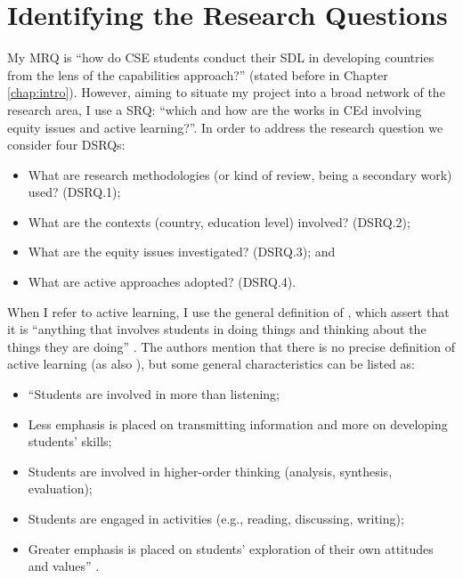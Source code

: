 \section{Identifying the Research Questions}
\label{rel-work:res-questions}

My \gls{MRQ} is “how do \gls{CSE} students conduct their \gls{SDL} in developing countries from the lens of the capabilities approach?” (stated before in Chapter \ref{chap:intro}). However, aiming to situate my project into a broad network of the research area, I use a \gls{SRQ}: “which and how are the works in \gls{CEd} involving equity issues and active learning?”. In order to address the research question we consider four \glspl{DSRQ}:
\begin{itemize}
    \item What are research methodologies (or kind of review, being a secondary work) used? (\gls{DSRQ}.1);
    \item What are the contexts (country, education level) involved? (\gls{DSRQ}.2);
    \item What are the equity issues investigated? (\gls{DSRQ}.3); and
    \item What are active approaches adopted? (\gls{DSRQ}.4).
\end{itemize}

When I refer to active learning, I use the general definition of , which assert that it is “anything that involves students in doing things and thinking about the things they are doing” \cite[p.~19]{bonwell:1991}. The authors mention that there is no precise definition of active learning (as also ), but some general characteristics can be listed as:
\begin{itemize}
    \item “Students are involved in more than listening;
    \item Less emphasis is placed on transmitting information and more on developing students’ skills;
    \item Students are involved in higher-order thinking (analysis, synthesis, evaluation);
    \item Students are engaged in activities (e.g., reading, discussing, writing);
    \item Greater emphasis is placed on students’ exploration of their own attitudes and values” \cite[p.~19]{bonwell:1991}.
\end{itemize}

